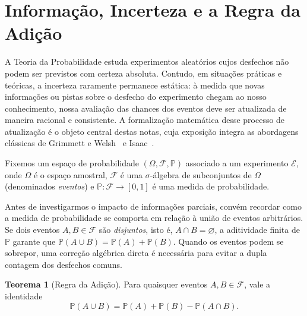 \documentclass[12pt,portuguese]{article}
\theoremstyle{definition}
\newtheorem{theorem}{Teorema}
\begin{document}


\section{Informação, Incerteza e a Regra da Adição}
\label{sec:introducao}

A Teoria da Probabilidade estuda experimentos aleatórios cujos desfechos não podem ser previstos com certeza absoluta. Contudo, em situações práticas e teóricas, a incerteza raramente permanece estática: à medida que novas informações ou pistas sobre o desfecho do experimento chegam ao nosso conhecimento, nossa avaliação das chances dos eventos deve ser atualizada de maneira racional e consistente. A formalização matemática desse processo de atualização é o objeto central destas notas, cuja exposição integra as abordagens clássicas de Grimmett e Welsh~\cite{GrimmettWelsh2014} e Isaac~\cite{Isaac1995}.

Fixemos um espaço de probabilidade \((\Omega, \mathcal{F}, \mathbb{P})\) associado a um experimento \(\mathcal{E}\), onde \(\Omega\) é o espaço amostral, \(\mathcal{F}\) é uma \(\sigma\)-álgebra de subconjuntos de \(\Omega\) (denominados \emph{eventos}) e \(\mathbb{P}: \mathcal{F} \to [0,1]\) é uma medida de probabilidade.

Antes de investigarmos o impacto de informações parciais, convém recordar como a medida de probabilidade se comporta em relação à união de eventos arbitrários. Se dois eventos \(A, B \in \mathcal{F}\) são \emph{disjuntos}, isto é, \(A \cap B = \varnothing\), a aditividade finita de \(\mathbb{P}\) garante que \(\mathbb{P}(A \cup B) = \mathbb{P}(A) + \mathbb{P}(B)\). Quando os eventos podem se sobrepor, uma correção algébrica direta é necessária para evitar a dupla contagem dos desfechos comuns.

\begin{theorem}[Regra da Adição]\label{thm:adicao}
Para quaisquer eventos \(A, B \in \mathcal{F}\), vale a identidade
\begin{equation}\label{eq:regra-adicao}
  \mathbb{P}(A \cup B) = \mathbb{P}(A) + \mathbb{P}(B) - \mathbb{P}(A \cap B).
\end{equation}
\end{theorem}
\end{document}
